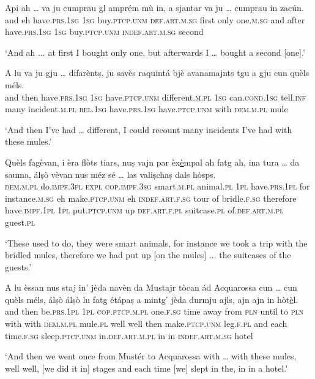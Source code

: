 \begin{linenumbers}
\gll  Api ah … va ju cumprau gl amprém mù in, a sjantar va ju … cumprau in zacún.\\
and eh {} have.\textsc{prs.1sg} \textsc{1sg} buy.\textsc{ptcp.unm} \textsc{def.art.m.sg} first only one.\textsc{m.sg} and after  have.\textsc{prs.1sg} \textsc{1sg} {} buy.\textsc{ptcp.unm}  \textsc{indef.art.m.sg} second\\
\end{linenumbers}
\medskip
\glt `And ah ... at first I bought only one, but afterwards I … bought a second [one].'
\medskip

\begin{linenumbers}
\gll  A lu va ju gju … difarèntṣ, ju savès raquintá bjè avanamajnts tgu a gju cun quèls méls.  \\
and then have.\textsc{prs.1sg} \textsc{1sg} have.\textsc{ptcp.unm} {} different.\textsc{m.pl} \textsc{1sg} can.\textsc{cond.1sg} tell.\textsc{inf} many incident.\textsc{m.pl} \textsc{rel.1sg} have.\textsc{prs.1sg} have.\textsc{ptcp.unm} with \textsc{dem.m.pl}  mule\\
\end{linenumbers}
\medskip
\glt `And then I’ve had … different, I could recount many incidents I’ve had with these mules.'
\medskip

\begin{linenumbers}
\gll  Quèls fagèvan, i èra flòts tiars, nuṣ vajn par èx\underline{è}mpal ah fatg ah, ina tura … da sauma, álṣò vèvan nus méz sé … las valiṣchaṣ dals hòsps.  \\
 \textsc{dem.m.pl} do.\textsc{impf.3pl} \textsc{expl} \textsc{cop.impf.3sg} smart.\textsc{m.pl} animal.\textsc{pl} \textsc{1pl} have.\textsc{prs.1pl} for instance.\textsc{m.sg} eh make.\textsc{ptcp.unm} eh \textsc{indef.art.f.sg} tour {} of bridle.\textsc{f.sg} therefore have.\textsc{impf.1pl} \textsc{1pl} put.\textsc{ptcp.unm} up {} \textsc{def.art.f.pl} suitcase.\textsc{pl}  of.\textsc{def.art.m.pl} guest.\textsc{pl} \\
\end{linenumbers}
\medskip
\glt `These used to do, they were smart animals, for instance we took a trip with the bridled mules, therefore we had put up [on the mules] ... the suitcases of the guests.'
\medskip

\begin{linenumbers}
\gll  A lu èssan nus staj in’ jèda navèn da Mustajr tòcan ád Acquarossa cun … cun quèls méls, álṣò álṣò lu fatg étápaṣ a mintg’ jèda durmju ajls, ajn ajn in hòt\underline{è}l.\\
and then be.\textsc{prs.1pl} \textsc{1pl} \textsc{cop.ptcp.m.pl} one.\textsc{f.sg} time away from \textsc{pln} until to \textsc{pln} with {} with \textsc{dem.m.pl} mule.\textsc{pl} well well then make.\textsc{ptcp.unm}  leg.\textsc{f.pl} and each time.\textsc{f.sg} sleep.\textsc{ptcp.unm} in.\textsc{def.art.m.pl} in in \textsc{indef.art.m.sg} hotel\\
\end{linenumbers}
\medskip
\glt `And then we went once from Mustér to Acquarossa with … with these mules, well well, [we did it in] stages and each time [we] slept in the, in in a hotel.'
\medskip

